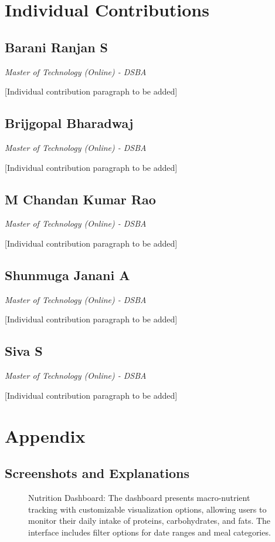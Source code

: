 \documentclass[10pt,twocolumn,letterpaper]{article}
\begin{document}
\section*{Individual Contributions}

\subsection*{Barani Ranjan S}
\textit{Master of Technology (Online) - DSBA}

[Individual contribution paragraph to be added]

\subsection*{Brijgopal Bharadwaj}
\textit{Master of Technology (Online) - DSBA}

[Individual contribution paragraph to be added]

\subsection*{M Chandan Kumar Rao}
\textit{Master of Technology (Online) - DSBA}

[Individual contribution paragraph to be added]

\subsection*{Shunmuga Janani A}
\textit{Master of Technology (Online) - DSBA}

[Individual contribution paragraph to be added]

\subsection*{Siva S}
\textit{Master of Technology (Online) - DSBA}

[Individual contribution paragraph to be added]

\clearpage
\section*{Appendix}

\subsection*{Screenshots and Explanations}

\begin{figure}[h]
\centering
{}
\caption{Nutrition Dashboard: The dashboard presents macro-nutrient tracking with customizable visualization options, allowing users to monitor their daily intake of proteins, carbohydrates, and fats. The interface includes filter options for date ranges and meal categories.}
\end{figure}
\end{document}
